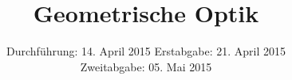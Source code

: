 
\subject{Anfängerpraktikum V408}
\title{Geometrische Optik}
\date{
  Durchführung: 14. April 2015
  \hspace{1em}
  Erstabgabe: 21. April 2015\\
  Zweitabgabe: 05. Mai 2015}


\maketitle
\thispagestyle{empty}
\newpage





\printbibliography


